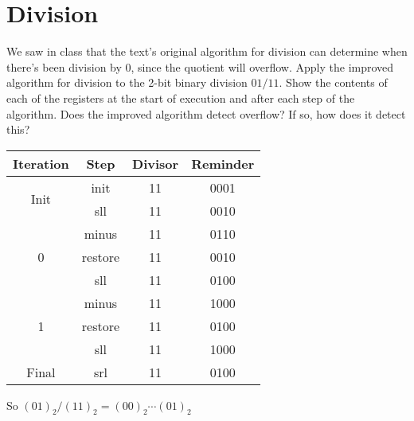 \documentclass[paper=a4, fontsize=11pt]{scrartcl} %
\begin{document}
\maketitle %

\section{Division}

\begin{fancyquotes}
    We saw in class that the text's original algorithm for division can determine when there's been division by $0$, since the quotient will overflow. Apply the improved algorithm for division to the 2-bit binary division $01/11$. Show the contents of each of the registers at the start of execution and after each step of the algorithm. Does the improved algorithm detect overflow? If so, how does it detect this?
\end{fancyquotes}


\begin{table}[hp]
    \centering
    \begin{tabular}{cccc}
        Iteration             & Step & Divisor & Reminder \\
        \toprule
        \multirow{2}{*}{Init} & init    & 11 & 0001 \\
                              & sll     & 11 & 0010 \\
        \midrule
        \multirow{3}{*}{0}    & minus   & 11 & 0110 \\
                              & restore & 11 & 0010 \\
                              & sll     & 11 & 0100 \\
        \midrule
        \multirow{3}{*}{1}    & minus   & 11 & 1000 \\
                              & restore & 11 & 0100 \\
                              & sll     & 11 & 1000 \\
        \midrule
        Final                 & srl     & 11 & 0100 \\
        \bottomrule
    \end{tabular}
\end{table}

So ${(01)}_2 / {(11)}_2 = {(00)}_2 \cdots {(01)}_2$
\end{document}
